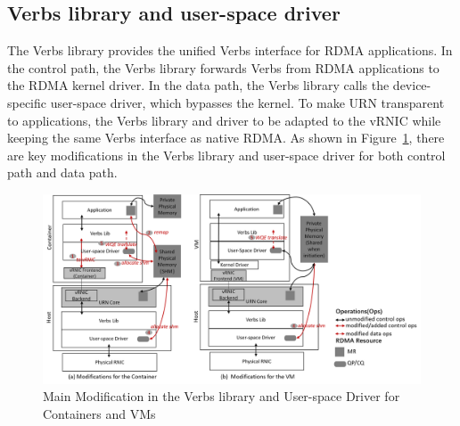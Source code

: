 \subsection{Verbs library and user-space driver}

The Verbs library provides the unified Verbs interface for RDMA applications. In the control path, the Verbs library forwards Verbs from RDMA applications to the RDMA kernel driver. In the data path, the Verbs library calls the device-specific user-space driver, which bypasses the kernel. To make URN transparent to applications, the Verbs library and driver to be adapted to the vRNIC while keeping the same Verbs interface as native RDMA. As shown in Figure~\ref{fig:verbs-driver}, there are key modifications in the Verbs library and user-space driver for both control path and data path.


\begin{figure}[!ht]
	\centering
	\includegraphics[width=0.8\linewidth]{images/verbs-driver}
	\caption{Main Modification in the Verbs library and User-space Driver for Containers and VMs}
	\label{fig:verbs-driver}
\end{figure}

